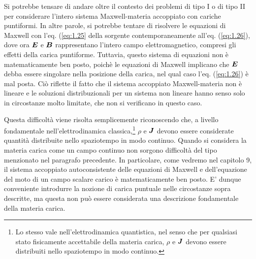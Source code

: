 Si potrebbe tensare di andare oltre il contesto dei problemi di tipo I o di tipo II per considerare l'intero sistema Maxwell-materia accoppiato con cariche puntiformi. In altre parole, si potrebbe tentare di risolvere le equazioni di Maxwell con l'eq. (\ref{eq:1.25} della sorgente contemporaneamente all'eq. (\ref{eq:1.26}), 
dove ora $\vb*{E}$ e $\vb*{B}$ rappresentano l'intero campo elettromagnetico, compresi gli effetti della carica puntiforme. Tuttavia, questo sistema di equazioni non è matematicamente ben posto, poichè le equazioni di Maxwell implicano che  $\vb*{E}$ debba essere singolare nella posizione della carica, nel qual caso l'eq. (\ref{eq:1.26}) è mal posta. Ciò riflette il fatto che il sistema accoppiato Maxwell-materia non è lineare e le soluzioni distribuzionali per un sistema non lineare hanno senso solo in circostanze molto limitate, che non si verificano in questo caso.

Questa difficoltà viene risolta semplicemente riconoscendo che, a livello fondamentale nell'elettrodinamica classica,\footnote{Lo stesso vale nell'elettrodinamica quantistica, nel senso che per qualsiasi stato fisicamente accettabile della materia carica, $\rho$ e  $\vb*{J}$ devono essere distribuiti nello spaziotempo in modo continuo.} $\rho$ e  $\vb*{J}$ devono essere considerate quantità distribuite nello spaziotempo in modo continuo. Quando si considera la materia carica come un campo continuo non sorgono difficoltà del tipo menzionato nel paragrafo precedente. In particolare, come vedremo nel capitolo 9, il sistema accoppiato autoconsistente delle equazioni di Maxwell e dell'equazione del moto di un campo scalare carico è matematicamente ben posto. E' dunque conveniente introdurre la nozione di carica puntuale nelle circostanze sopra descritte, ma questa non può essere considerata una descrizione fondamentale della materia carica.


  
    
